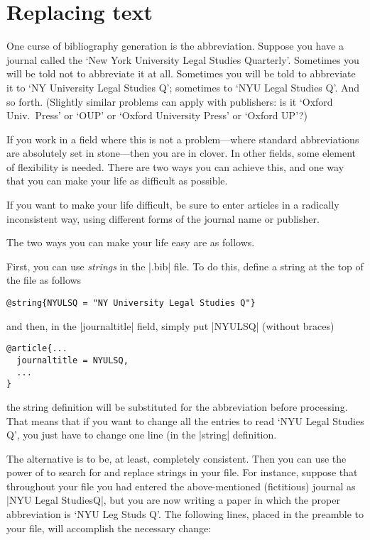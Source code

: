 \section{Replacing text}

One curse of bibliography generation is the abbreviation. Suppose you
have a journal called the `New York University Legal Studies
Quarterly'. Sometimes you will be told not to abbreviate it at
all. Sometimes you will be told to abbreviate it to `NY University
Legal Studies Q'; sometimes to `NYU Legal Studies Q'. And so
forth. (Slightly similar problems can apply with publishers: is it
`Oxford Univ.\ Press' or `OUP' or `Oxford University Press' or `Oxford
UP'?)

If you work in a field where this is not a problem---where standard
abbreviations are absolutely set in stone---then you are in
clover. In other fields, some element of flexibility is needed. There
are two ways you can achieve this, and one way that you can make your
life as difficult as possible.

If you want to make your life difficult, be sure to enter articles in
a radically inconsistent way, using different forms of the journal
name or publisher.

The two ways you can make your life easy are as follows.

First, you can use \emph{strings} in the |.bib| file. To do this,
define a string at the top of the file as follows
\begin{Verbatim}
@string{NYULSQ = "NY University Legal Studies Q"}
\end{Verbatim}
and then, in the |journaltitle| field, simply put |NYULSQ| (without braces)
\begin{Verbatim}
@article{...
  journaltitle = NYULSQ,
  ...
}
\end{Verbatim}
the string definition will be substituted for the abbreviation before
processing. That means that if you want to change all the entries to
read `NYU Legal Studies Q', you just have to change one line (in the
|string| definition.

The alternative is to be, at least, completely consistent. Then you
can use the power of  to search for and replace strings
in your file. For instance, suppose that throughout your file you had
entered the above-mentioned (fictitious) journal as |NYU Legal StudiesQ|,
but you are now writing a paper in which the proper abbreviation
is `NYU Leg Studs Q'. The following lines, placed in the preamble to
your file, will accomplish the necessary change:\label{datamap}

